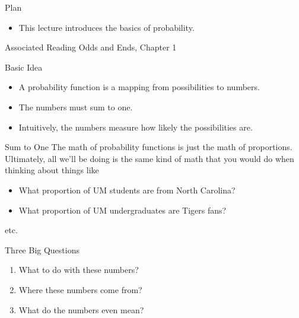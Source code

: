 \documentclass[
  ignorenonframetext,
]{beamer}
\providecommand{\tightlist}{%
  \setlength{\itemsep}{0pt}\setlength{\parskip}{0pt}}
\begin{document}
\begin{frame}{Plan}
\protect\hypertarget{plan}{}
\begin{itemize}
\tightlist
\item
  This lecture introduces the basics of probability.
\end{itemize}
\end{frame}

\begin{frame}{Associated Reading}
\protect\hypertarget{associated-reading}{}
Odds and Ends, Chapter 1
\end{frame}

\begin{frame}{Basic Idea}
\protect\hypertarget{basic-idea}{}
\begin{itemize}
\tightlist
\item
  A probability function is a mapping from possibilities to numbers.
\item
  The numbers must sum to one.
\item
  Intuitively, the numbers measure how likely the possibilities are.
\end{itemize}
\end{frame}

\begin{frame}{Sum to One}
\protect\hypertarget{sum-to-one}{}
The math of probability functions is just the math of proportions.
Ultimately, all we'll be doing is the same kind of math that you would
do when thinking about things like

\begin{itemize}
\tightlist
\item
  What proportion of UM students are from North Carolina?
\item
  What proportion of UM undergraduates are Tigers fans?
\end{itemize}

etc.
\end{frame}

\begin{frame}{Three Big Questions}
\protect\hypertarget{three-big-questions}{}
\begin{enumerate}[<+->]
\tightlist
\item
  What to do with these numbers?
\item
  Where these numbers come from?
\item
  What do the numbers even mean?
\end{enumerate}
\end{frame}
\end{document}
